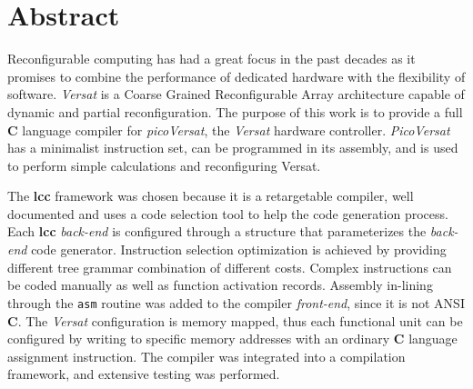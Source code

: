 
\section*{Abstract}




Reconfigurable computing has had a great focus in the past decades as it
promises to combine the performance of dedicated hardware with the flexibility
of software.  {\it Versat} is a Coarse Grained Reconfigurable Array architecture
capable of dynamic and partial reconfiguration. The purpose of this work is to
provide a full {\bf C} language compiler for {\it picoVersat}, the {\it Versat}
hardware controller. {\it PicoVersat} has a minimalist instruction
set, can be programmed in its assembly, and is used to perform simple
calculations and reconfiguring Versat. %

The {\bf lcc} framework was chosen because it is a retargetable compiler, well
documented and uses a code selection tool to help the code generation
process. Each {\bf lcc} {\it back-end} is configured through a structure that
parameterizes the {\it back-end} code generator.  Instruction selection
optimization is achieved by providing different tree grammar combination of
different costs. Complex instructions can be coded manually as well as function
activation records. Assembly in-lining through the {\tt asm} routine was added
to the compiler {\it front-end}, since it is not {\sc ANSI} {\bf C}. %
The {\it Versat} configuration is memory mapped, thus each functional unit
can be configured by writing to specific memory addresses with an ordinary
{\bf C} language assignment instruction. The compiler was integrated
into a compilation framework, and extensive testing was performed. %

